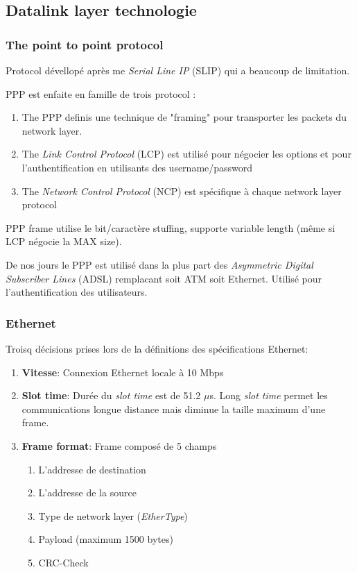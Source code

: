 \subsection{Datalink layer technologie}

\subsubsection{The point to point protocol}
Protocol dévellopé après me \textit{Serial Line IP} (SLIP) qui a beaucoup de limitation.

PPP est enfaite en famille de trois protocol :
\begin{enumerate}
    \item The PPP definis une technique de "framing" pour transporter les packets du network layer.
    \item The \textit{Link Control Protocol} (LCP) est utilisé pour négocier les options et pour l'authentification en utilisants des username/password
    \item The \textit{Network Control Protocol} (NCP) est spécifique à chaque network layer protocol
\end{enumerate}

PPP frame utilise le bit/caractère stuffing, supporte variable length (même si LCP négocie la MAX size).

De nos jours le PPP est utilisé dans la plus part des \textit{Asymmetric Digital Subscriber Lines} (ADSL) remplacant soit ATM soit Ethernet. Utilisé pour l'authentification des utilisateurs.

\subsubsection{Ethernet}

Troisq décisions prises lors de la définitions des spécifications Ethernet:
\begin{enumerate}
\item \textbf{Vitesse}: Connexion Ethernet locale à 10 Mbps
\item \textbf{Slot time}: Durée du \textit{slot time} est de 51.2 $\mu$s. Long \textit{slot time} permet les communications longue distance mais diminue la taille maximum d'une frame.
\item \textbf{Frame format}: Frame composé de 5 champs
\begin{enumerate}
\item L'addresse de destination
\item L'addresse de la source
\item Type de network layer (\textit{EtherType})
\item Payload (maximum 1500 bytes)
\item CRC-Check
\end{enumerate}
\end{enumerate}

